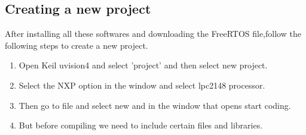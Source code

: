 \documentclass[11pt,a4paper]{book}
\begin{document}
\subsection{Creating a new project}
After installing all these softwares and downloading the FreeRTOS file,follow the following steps to create a new project.
\begin{enumerate}
	\item Open Keil uvision4 and select 'project' and then select new project.
	\item Select the NXP option in the window and select lpc2148 processor.
	\item Then go to file and select new and in the window that opens start coding.
	\item But before compiling we need to include certain files and libraries.


\end{enumerate}
\end{document}
